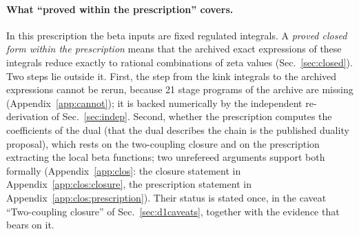 \documentclass[11pt,a4paper]{article}
\numberwithin{equation}{section}
\begin{document}
\paragraph{What ``proved within the prescription'' covers.} In this prescription the beta inputs are fixed
regulated integrals. A \emph{proved closed form within the prescription} means that the archived exact expressions of
these integrals reduce exactly to rational combinations of zeta values (Sec.~\ref{sec:closed}). Two steps lie outside
it. First, the step from the kink integrals to the archived expressions cannot be rerun, because 21 stage programs of
the archive are missing (Appendix~\ref{app:cannot}); it is backed numerically by the independent re-derivation of
Sec.~\ref{sec:indep}. Second, whether the prescription computes the coefficients of the dual (that the dual
describes the chain is the published duality proposal), which rests on the two-coupling closure and on the prescription extracting the local beta functions; two unrefereed arguments support
both formally (Appendix~\ref{app:clos}: the closure statement in Appendix~\ref{app:clos:closure}, the prescription
statement in Appendix~\ref{app:clos:prescription}). Their status is stated once, in the caveat ``Two-coupling
closure'' of Sec.~\ref{sec:d1caveats}, together with the evidence that bears on it.
\end{document}
